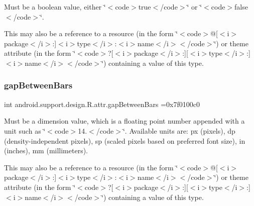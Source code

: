 Must be a boolean value, either \char`\"{}$<$code$>$true$<$/code$>$\char`\"{} or \char`\"{}$<$code$>$false$<$/code$>$\char`\"{}. 

This may also be a reference to a resource (in the form \char`\"{}$<$code$>$@\mbox{[}$<$i$>$package$<$/i$>$\+:\mbox{]}$<$i$>$type$<$/i$>$\+:$<$i$>$name$<$/i$>$$<$/code$>$\char`\"{}) or theme attribute (in the form \char`\"{}$<$code$>$?\mbox{[}$<$i$>$package$<$/i$>$\+:\mbox{]}\mbox{[}$<$i$>$type$<$/i$>$\+:\mbox{]}$<$i$>$name$<$/i$>$$<$/code$>$\char`\"{}) containing a value of this type. \mbox{\label{classandroid_1_1support_1_1design_1_1R_1_1attr_adbe39ebf03ed680b511ec8d065fa19cb}} 
\subsubsection{\texorpdfstring{gap\+Between\+Bars}{gapBetweenBars}}
{\footnotesize\ttfamily int android.\+support.\+design.\+R.\+attr.\+gap\+Between\+Bars =0x7f0100c0\hspace{0.3cm}{\ttfamily [static]}}

Must be a dimension value, which is a floating point number appended with a unit such as \char`\"{}$<$code$>$14.\+5sp$<$/code$>$\char`\"{}. Available units are\+: px (pixels), dp (density-\/independent pixels), sp (scaled pixels based on preferred font size), in (inches), mm (millimeters). 

This may also be a reference to a resource (in the form \char`\"{}$<$code$>$@\mbox{[}$<$i$>$package$<$/i$>$\+:\mbox{]}$<$i$>$type$<$/i$>$\+:$<$i$>$name$<$/i$>$$<$/code$>$\char`\"{}) or theme attribute (in the form \char`\"{}$<$code$>$?\mbox{[}$<$i$>$package$<$/i$>$\+:\mbox{]}\mbox{[}$<$i$>$type$<$/i$>$\+:\mbox{]}$<$i$>$name$<$/i$>$$<$/code$>$\char`\"{}) containing a value of this type. \mbox{\label{classandroid_1_1support_1_1design_1_1R_1_1attr_afe5121a9441846953200d55ba44308e6}} 
